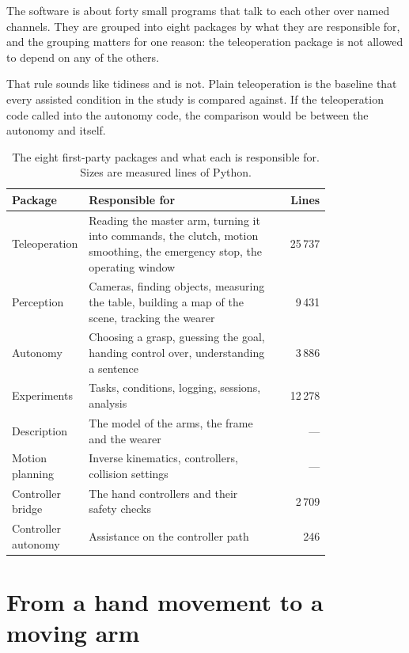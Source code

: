 The software is about forty small programs that talk to each other over named
channels. They are grouped into eight packages by what they are responsible
for, and the grouping matters for one reason: the teleoperation package is not
allowed to depend on any of the others.

That rule sounds like tidiness and is not. Plain teleoperation is the baseline
that every assisted condition in the study is compared against. If the
teleoperation code called into the autonomy code, the comparison would be
between the autonomy and itself.

\begin{table}[htbp]
  \centering
  \small
  \caption[Software packages]{The eight first-party packages and what each is
  responsible for. Sizes are measured lines of Python.}
  \label{tab:packages}
  \begin{tabular}{@{}p{0.20\linewidth}p{0.60\linewidth}r@{}}
    \toprule
    \textbf{Package} & \textbf{Responsible for} & \textbf{Lines} \\
    \midrule
    Teleoperation & Reading the master arm, turning it into commands, the
      clutch, motion smoothing, the emergency stop, the operating window &
      25\,737 \\
    Perception & Cameras, finding objects, measuring the table, building a map
      of the scene, tracking the wearer & 9\,431 \\
    Autonomy & Choosing a grasp, guessing the goal, handing control over,
      understanding a sentence & 3\,886 \\
    Experiments & Tasks, conditions, logging, sessions, analysis & 12\,278 \\
    Description & The model of the arms, the frame and the wearer & --- \\
    Motion planning & Inverse kinematics, controllers, collision settings &
      --- \\
    Controller bridge & The hand controllers and their safety checks &
      2\,709 \\
    Controller autonomy & Assistance on the controller path & 246 \\
    \bottomrule
  \end{tabular}
\end{table}

\section{From a hand movement to a moving arm}

